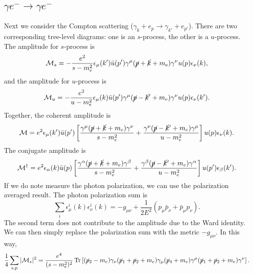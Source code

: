 \documentclass[aps,prb,superscriptaddress,nofootinbib]{revtex4}
\def \Tr{\operatorname{Tr}}
\begin{document}
\subsection{$\gamma e^- \rightarrow \gamma e^-$}
Next we consider the Compton scattering ($\gamma_{k}+e_{p} \rightarrow \gamma_{k'} + e_{p'}$).
There are two corresponding tree-level diagrams: one is an $s$-process, the other is a $u$-process.
The amplitude for $s$-process is
\begin{equation}
	\mathcal M_s = -\frac{e^2}{s-m_e^2}\epsilon_\mu(k') \bar u(p') \gamma^\mu (\cancel p + \cancel k + m_e) \gamma^\nu u(p) \epsilon_\nu(k),
\end{equation}
and the amplitude for $u$-process is
\begin{equation}
	\mathcal M_u = -\frac{e^2}{u-m_e^2} \epsilon_\mu(k) \bar u(p')\gamma^\mu (\cancel p-\cancel k' +m_e)\gamma^\nu u(p) \epsilon_\nu(k').
\end{equation}
Together, the coherent amplitude is
\begin{equation}
	\mathcal M = e^2 \epsilon_\mu(k')\bar u(p')\left[\frac{ \gamma^\mu (\cancel p + \cancel k + m_e) \gamma^\nu }{s-m_e^2} + \frac{\gamma^\nu (\cancel p-\cancel k' +m_e)\gamma^\mu}{u-m_e^2}\right] u(p) \epsilon_\nu(k).
\end{equation}
The conjugate amplitude is
\begin{equation}
	\mathcal M^\dagger = e^2 \epsilon_\alpha(k)\bar u(p)\left[\frac{\gamma^\alpha (\cancel p + \cancel k + m_e) \gamma^\beta}{s-m_e^2} + \frac{\gamma^\beta (\cancel p-\cancel k' +m_e)\gamma^\alpha}{u-m_e^2}\right] u(p') \epsilon_\beta(k').
\end{equation}
If we do note measure the photon polarization, we can use the polarization averaged result.
The photon polarization sum is
\begin{equation}
	\sum_i \epsilon^i_\mu(k) \epsilon^i_\nu(k) = -g_{\mu\nu} + \frac{1}{2E^2}(p_\mu \bar p_\nu + \bar p_\mu p_\nu).
\end{equation}
The second term does not contribute to the amplitude due to the Ward identity.
We can then simply replace the polarization sum with the metric $-g_{\mu\nu}$.
In this way,
\begin{equation}
	\frac{1}{4}\sum_{\mathrm{s,p}}|\mathcal M_s|^2 = \frac{e^4}{(s-m_e^2)^2} \Tr\left[ (\cancel p_2-m_e) \gamma_\nu (\cancel p_1 + \cancel p_2 + m_e) \gamma_\mu (\cancel p_4+m_e) \gamma^\mu (\cancel p_1 + \cancel p_2 + m_e) \gamma^\nu \right].
\end{equation}
\end{document}
